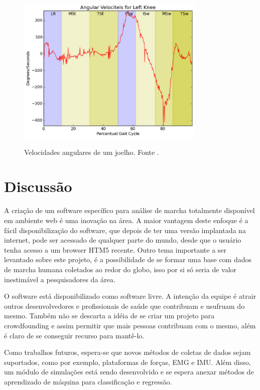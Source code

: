 \documentclass[journal]{IEEEtran}
\begin{document}
\begin{figure}[!t]
	\centering
	{\includegraphics[width=9cm]{tela26}}
	\caption{Velocidades angulares de um joelho. Fonte \cite{Lima2015}.}
	\label{va}
\end{figure}


\section{Discussão}

A criação de um software específico para análise de marcha totalmente disponível em ambiente web é
uma inovação na área. A maior vantagem deste enfoque é a fácil disponibilização do software,
que depois de ter uma versão implantada na internet, pode ser acessado de qualquer parte do mundo,
desde que o usuário tenha acesso a um browser HTM5 recente.
Outro tema importante a ser levantado sobre este projeto, é a possibilidade de se formar uma base
com dados de marcha humana coletados ao redor do globo, isso por si só seria de valor inestimável
a pesquisadores da área.

O software está disponibilizado como software livre. A intenção da equipe é atrair outros desenvolvedores
e profissionais de saúde que contribuam e usufruam do mesmo. Também não se descarta a idéia de se
criar um projeto para crowdfounding e assim permitir que mais pessoas contribuam com o mesmo, além
é claro de se conseguir recurso para mantê-lo.

Como trabalhos futuros, espera-se que novos métodos de coletas de dados sejam suportados, como por exemplo, plataformas de forças, EMG e IMU. Além disso, um módulo de simulações está sendo desenvolvido e se espera 
anexar métodos de aprendizado de máquina para classificação e regressão.


\end{document}
